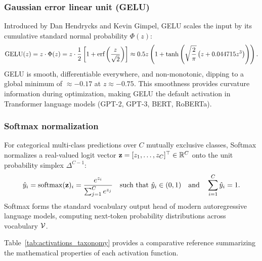 \documentclass[../../main.tex]{subfiles}
\begin{document}
\subsubsection{Gaussian error linear unit (GELU)}
Introduced by Dan Hendrycks and Kevin Gimpel, GELU scales the input by its cumulative standard normal probability $\Phi(z)$:
\begin{equation}
\label{eq:gelu_def}
\operatorname{\mathrm{GELU}}(z) = z \cdot \Phi(z) = z \cdot \frac{1}{2} \left[ 1 + \text{erf}\left( \frac{z}{\sqrt{2}} \right) \right] \approx 0.5z \left( 1 + \tanh\left( \sqrt{\frac{2}{\pi}} \left( z + 0.044715 z^3 \right) \right) \right).
\end{equation}
GELU is smooth, differentiable everywhere, and non-monotonic, dipping to a global minimum of $\approx -0.17$ at $z \approx -0.75$. This smoothness provides curvature information during optimization, making GELU the default activation in Transformer language models (GPT-2, GPT-3, BERT, RoBERTa).

\subsubsection{Softmax normalization}
For categorical multi-class predictions over $C$ mutually exclusive classes, Softmax normalizes a real-valued logit vector $\mathbf{z} = [z_1, \dots, z_C]^\top \in \mathbb{R}^C$ onto the unit probability simplex $\Delta^{C-1}$:
\begin{equation}
\label{eq:softmax_def}
\hat{y}_i = \operatorname{\mathrm{softmax}}(\mathbf{z})_i = \frac{e^{z_i}}{\sum_{j=1}^C e^{z_j}} \quad \text{such that } \hat{y}_i \in (0, 1) \quad \text{and} \quad \sum_{i=1}^C \hat{y}_i = 1.
\end{equation}
Softmax forms the standard vocabulary output head of modern autoregressive language models, computing next-token probability distributions across vocabulary $\mathcal{V}$.

Table~\ref{tab:activations_taxonomy} provides a comparative reference summarizing the mathematical properties of each activation function.
\end{document}
